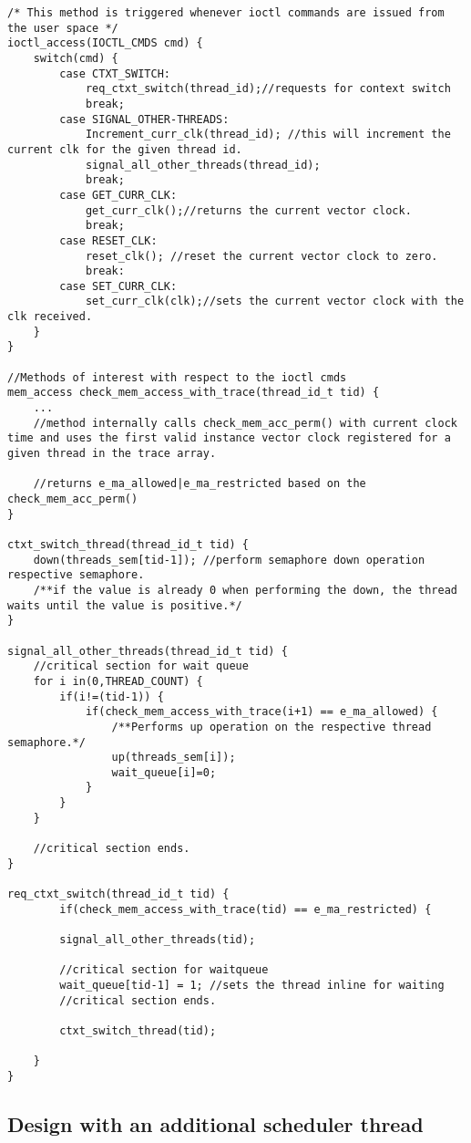 \begin{lstlisting}[title=Kernel Space - IOCTL, style=customc]
/* This method is triggered whenever ioctl commands are issued from the user space */
ioctl_access(IOCTL_CMDS cmd) {	
	switch(cmd) {
		case CTXT_SWITCH: 
			req_ctxt_switch(thread_id);//requests for context switch
			break;
		case SIGNAL_OTHER-THREADS:
			Increment_curr_clk(thread_id); //this will increment the current clk for the given thread id.
			signal_all_other_threads(thread_id);
			break;
		case GET_CURR_CLK:
			get_curr_clk();//returns the current vector clock.
			break;
		case RESET_CLK:
			reset_clk(); //reset the current vector clock to zero.
			break:		
		case SET_CURR_CLK:
			set_curr_clk(clk);//sets the current vector clock with the clk received.
	}
}

//Methods of interest with respect to the ioctl cmds
mem_access check_mem_access_with_trace(thread_id_t tid) {
	...
	//method internally calls check_mem_acc_perm() with current clock time and uses the first valid instance vector clock registered for a given thread in the trace array.
		
	//returns e_ma_allowed|e_ma_restricted based on the check_mem_acc_perm()
}

ctxt_switch_thread(thread_id_t tid) {	
	down(threads_sem[tid-1]); //perform semaphore down operation respective semaphore.
	/**if the value is already 0 when performing the down, the thread waits until the value is positive.*/
}

signal_all_other_threads(thread_id_t tid) {
	//critical section for wait queue
	for i in(0,THREAD_COUNT) {
		if(i!=(tid-1)) {
			if(check_mem_access_with_trace(i+1) == e_ma_allowed) {
				/**Performs up operation on the respective thread semaphore.*/
				up(threads_sem[i]);
				wait_queue[i]=0;			
			}		
		}
	}	
	
	//critical section ends.
}

req_ctxt_switch(thread_id_t tid) {
		if(check_mem_access_with_trace(tid) == e_ma_restricted) {

		signal_all_other_threads(tid);
		
		//critical section for waitqueue
		wait_queue[tid-1] = 1; //sets the thread inline for waiting
		//critical section ends.
		
		ctxt_switch_thread(tid);

	}
}

\end{lstlisting}

\subsection{Design with an additional scheduler thread}\label{sec_add_thread}

